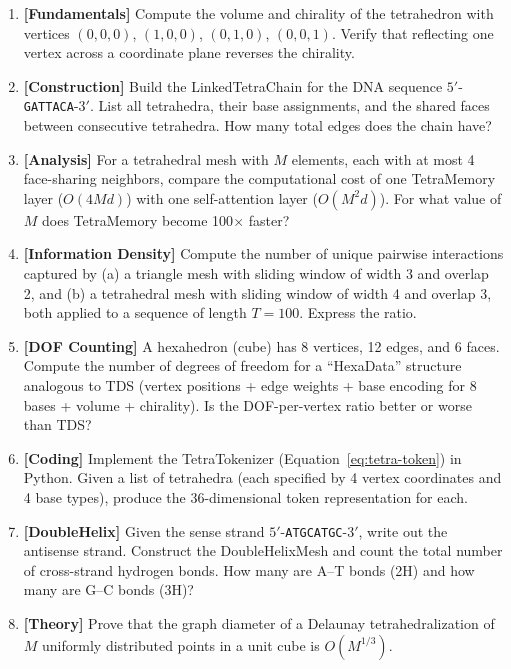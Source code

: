 \begin{enumerate}[label=\textbf{10.\arabic*.}, leftmargin=2.5em]

\item \textbf{[Fundamentals]} Compute the volume and chirality of the tetrahedron
with vertices $(0,0,0)$, $(1,0,0)$, $(0,1,0)$, $(0,0,1)$. Verify that
reflecting one vertex across a coordinate plane reverses the chirality.

\item \textbf{[Construction]} Build the LinkedTetraChain for the DNA sequence
$5'$-\texttt{GATTACA}-$3'$. List all tetrahedra, their base assignments,
and the shared faces between consecutive tetrahedra. How many total edges
does the chain have?

\item \textbf{[Analysis]} For a tetrahedral mesh with $M$ elements, each with at
most 4 face-sharing neighbors, compare the computational cost of one TetraMemory
layer ($O(4Md)$) with one self-attention layer ($O(M^2 d)$). For what value of
$M$ does TetraMemory become 100$\times$ faster?

\item \textbf{[Information Density]} Compute the number of unique pairwise
interactions captured by (a) a triangle mesh with sliding window of width 3
and overlap 2, and (b) a tetrahedral mesh with sliding window of width 4 and
overlap 3, both applied to a sequence of length $T = 100$. Express the ratio.

\item \textbf{[DOF Counting]} A hexahedron (cube) has 8 vertices, 12 edges, and
6 faces. Compute the number of degrees of freedom for a ``HexaData'' structure
analogous to TDS (vertex positions + edge weights + base encoding for 8 bases +
volume + chirality). Is the DOF-per-vertex ratio better or worse than TDS?

\item \textbf{[Coding]} Implement the TetraTokenizer (Equation~\ref{eq:tetra-token})
in Python. Given a list of tetrahedra (each specified by 4 vertex coordinates
and 4 base types), produce the 36-dimensional token representation for each.

\item \textbf{[DoubleHelix]} Given the sense strand $5'$-\texttt{ATGCATGC}-$3'$,
write out the antisense strand. Construct the DoubleHelixMesh and count the
total number of cross-strand hydrogen bonds. How many are A--T bonds (2H) and
how many are G--C bonds (3H)?

\item \textbf{[Theory]} Prove that the graph diameter of a Delaunay
tetrahedralization of $M$ uniformly distributed points in a unit cube is
$O(M^{1/3})$.


\end{enumerate}
